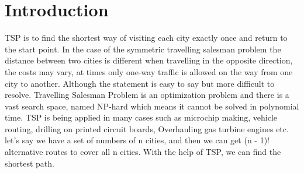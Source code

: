 \documentclass{article}
\begin{document}
\section{Introduction}
TSP is to find the shortest way of visiting each city exactly once and return to the start point. In the case of the
symmetric travelling salesman problem the distance between two cities is different when travelling in the opposite
direction, the costs may vary, at times only one-way traffic is allowed on the way from one city to another. Although
the statement is easy to say but more difficult to resolve. Travelling Salesman Problem is an optimization problem
and there is a vast search space, named NP-hard which means it cannot be solved in polynomial time. TSP is being
applied in many cases such as microchip making, vehicle routing, drilling on printed circuit boards, Overhauling gas
turbine engines etc. let’s say we have a set of numbers of n cities, and then we can get (n - 1)! alternative routes to
cover all n cities. With the help of TSP, we can find the shortest path.
\end{document}
